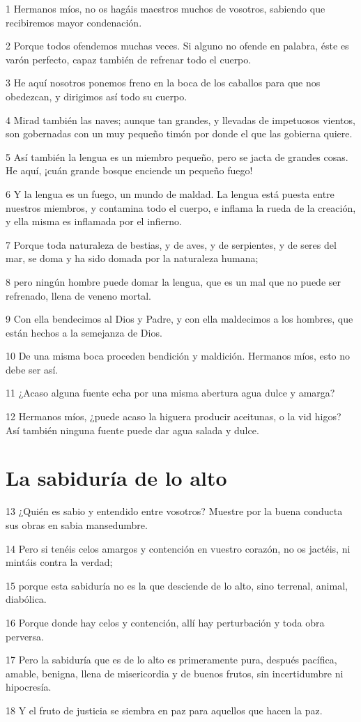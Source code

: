 \par 1 Hermanos míos, no os hagáis maestros muchos de vosotros, sabiendo que recibiremos mayor condenación.
\par 2 Porque todos ofendemos muchas veces. Si alguno no ofende en palabra, éste es varón perfecto, capaz también de refrenar todo el cuerpo.
\par 3 He aquí nosotros ponemos freno en la boca de los caballos para que nos obedezcan, y dirigimos así todo su cuerpo.
\par 4 Mirad también las naves; aunque tan grandes, y llevadas de impetuosos vientos, son gobernadas con un muy pequeño timón por donde el que las gobierna quiere.
\par 5 Así también la lengua es un miembro pequeño, pero se jacta de grandes cosas. He aquí, ¡cuán grande bosque enciende un pequeño fuego!
\par 6 Y la lengua es un fuego, un mundo de maldad. La lengua está puesta entre nuestros miembros, y contamina todo el cuerpo, e inflama la rueda de la creación, y ella misma es inflamada por el infierno.
\par 7 Porque toda naturaleza de bestias, y de aves, y de serpientes, y de seres del mar, se doma y ha sido domada por la naturaleza humana;
\par 8 pero ningún hombre puede domar la lengua, que es un mal que no puede ser refrenado, llena de veneno mortal.
\par 9 Con ella bendecimos al Dios y Padre, y con ella maldecimos a los hombres, que están hechos a la semejanza de Dios.
\par 10 De una misma boca proceden bendición y maldición. Hermanos míos, esto no debe ser así.
\par 11 ¿Acaso alguna fuente echa por una misma abertura agua dulce y amarga?
\par 12 Hermanos míos, ¿puede acaso la higuera producir aceitunas, o la vid higos? Así también ninguna fuente puede dar agua salada y dulce.

\section*{La sabiduría de lo alto}

\par 13 ¿Quién es sabio y entendido entre vosotros? Muestre por la buena conducta sus obras en sabia mansedumbre.
\par 14 Pero si tenéis celos amargos y contención en vuestro corazón, no os jactéis, ni mintáis contra la verdad;
\par 15 porque esta sabiduría no es la que desciende de lo alto, sino terrenal, animal, diabólica.
\par 16 Porque donde hay celos y contención, allí hay perturbación y toda obra perversa.
\par 17 Pero la sabiduría que es de lo alto es primeramente pura, después pacífica, amable, benigna, llena de misericordia y de buenos frutos, sin incertidumbre ni hipocresía.
\par 18 Y el fruto de justicia se siembra en paz para aquellos que hacen la paz.

